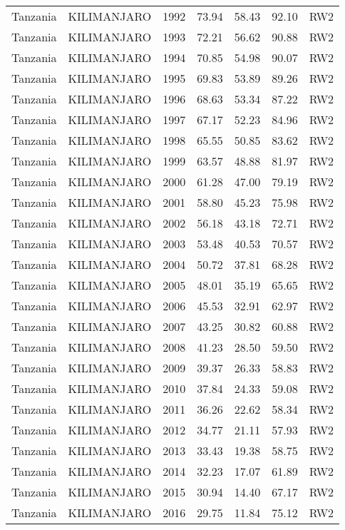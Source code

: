 \begin{longtable}{lllrrrl}
  Tanzania & KILIMANJARO & 1992 & 73.94 & 58.43 & 92.10 & RW2 \\ 
  Tanzania & KILIMANJARO & 1993 & 72.21 & 56.62 & 90.88 & RW2 \\ 
  Tanzania & KILIMANJARO & 1994 & 70.85 & 54.98 & 90.07 & RW2 \\ 
  Tanzania & KILIMANJARO & 1995 & 69.83 & 53.89 & 89.26 & RW2 \\ 
  Tanzania & KILIMANJARO & 1996 & 68.63 & 53.34 & 87.22 & RW2 \\ 
  Tanzania & KILIMANJARO & 1997 & 67.17 & 52.23 & 84.96 & RW2 \\ 
  Tanzania & KILIMANJARO & 1998 & 65.55 & 50.85 & 83.62 & RW2 \\ 
  Tanzania & KILIMANJARO & 1999 & 63.57 & 48.88 & 81.97 & RW2 \\ 
  Tanzania & KILIMANJARO & 2000 & 61.28 & 47.00 & 79.19 & RW2 \\ 
  Tanzania & KILIMANJARO & 2001 & 58.80 & 45.23 & 75.98 & RW2 \\ 
  Tanzania & KILIMANJARO & 2002 & 56.18 & 43.18 & 72.71 & RW2 \\ 
  Tanzania & KILIMANJARO & 2003 & 53.48 & 40.53 & 70.57 & RW2 \\ 
  Tanzania & KILIMANJARO & 2004 & 50.72 & 37.81 & 68.28 & RW2 \\ 
  Tanzania & KILIMANJARO & 2005 & 48.01 & 35.19 & 65.65 & RW2 \\ 
  Tanzania & KILIMANJARO & 2006 & 45.53 & 32.91 & 62.97 & RW2 \\ 
  Tanzania & KILIMANJARO & 2007 & 43.25 & 30.82 & 60.88 & RW2 \\ 
  Tanzania & KILIMANJARO & 2008 & 41.23 & 28.50 & 59.50 & RW2 \\ 
  Tanzania & KILIMANJARO & 2009 & 39.37 & 26.33 & 58.83 & RW2 \\ 
  Tanzania & KILIMANJARO & 2010 & 37.84 & 24.33 & 59.08 & RW2 \\ 
  Tanzania & KILIMANJARO & 2011 & 36.26 & 22.62 & 58.34 & RW2 \\ 
  Tanzania & KILIMANJARO & 2012 & 34.77 & 21.11 & 57.93 & RW2 \\ 
  Tanzania & KILIMANJARO & 2013 & 33.43 & 19.38 & 58.75 & RW2 \\ 
  Tanzania & KILIMANJARO & 2014 & 32.23 & 17.07 & 61.89 & RW2 \\ 
  Tanzania & KILIMANJARO & 2015 & 30.94 & 14.40 & 67.17 & RW2 \\ 
  Tanzania & KILIMANJARO & 2016 & 29.75 & 11.84 & 75.12 & RW2 \\ 

\end{longtable}
